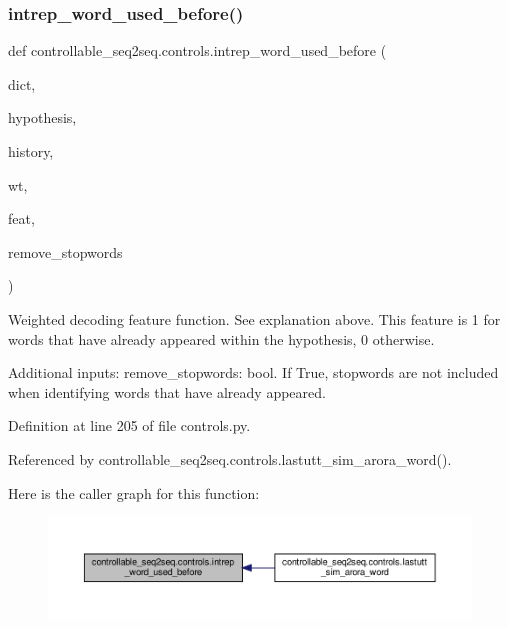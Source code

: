 \subsubsection{\texorpdfstring{intrep\+\_\+word\+\_\+used\+\_\+before()}{intrep\_word\_used\_before()}}
{\footnotesize\ttfamily def controllable\+\_\+seq2seq.\+controls.\+intrep\+\_\+word\+\_\+used\+\_\+before (\begin{DoxyParamCaption}\item[{}]{dict,  }\item[{}]{hypothesis,  }\item[{}]{history,  }\item[{}]{wt,  }\item[{}]{feat,  }\item[{}]{remove\+\_\+stopwords }\end{DoxyParamCaption})}

\begin{DoxyVerb}Weighted decoding feature function. See explanation above.
This feature is 1 for words that have already appeared within the hypothesis,
0 otherwise.

Additional inputs:
  remove_stopwords: bool. If True, stopwords are not included when identifying words
    that have already appeared.
\end{DoxyVerb}
 

Definition at line 205 of file controls.\+py.



Referenced by controllable\+\_\+seq2seq.\+controls.\+lastutt\+\_\+sim\+\_\+arora\+\_\+word().

Here is the caller graph for this function\+:
\nopagebreak
\begin{figure}[H]
\begin{center}
\leavevmode
\includegraphics[width=350pt]{namespacecontrollable__seq2seq_1_1controls_af7cfe0f401279ee7fa767d05fcb81286_icgraph}
\end{center}
\end{figure}
\mbox{\label{namespacecontrollable__seq2seq_1_1controls_ae87a6983e2e8bfd8a5eaa33973c6acc3}} 
